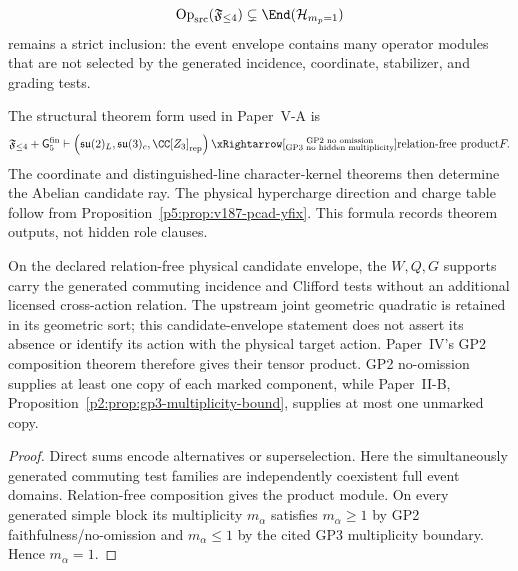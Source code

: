 \documentclass[12pt,a4paper]{article}
\begin{document}
\begin{equation}
\label{p5:eq:src-op-subset-envelope}
\operatorname{Op}_{\rm src}(\mathfrak F_{\le4})
\subsetneq
\End(\mathcal H_{m_p=1})
\end{equation}
remains a strict inclusion: the event envelope contains many operator modules
that are not selected by the generated incidence, coordinate, stabilizer, and
grading tests.

\begin{proposition}
\label{p5:prop:componentwise-closure-form}
The structural theorem form used in Paper~V-A is
\begin{equation}
\label{p5:eq:componentwise-theorem-form}
\mathfrak F_{\le4}+\mathsf G_5^{\rm fin}
\vdash
\left(
\mathfrak{su}(2)_L,
\mathfrak{su}(3)_c,
\CC[Z_3]_{\rm rep}
\right)
\xRightarrow[\substack{\text{GP2 no omission}\\
\text{GP3 no hidden multiplicity}}]{\text{relation-free product}}
F.
\end{equation}
The coordinate and distinguished-line character-kernel theorems then
determine the Abelian candidate ray.  The physical hypercharge direction and
charge table follow from Proposition~\ref{p5:prop:v187-pcad-yfix}.  This formula records
theorem outputs, not hidden role clauses.
\end{proposition}

\begin{theorem}
\label{p5:thm:componentwise-no-deletion}
On the declared relation-free physical candidate envelope, the \(W,Q,G\) supports carry the generated commuting incidence and Clifford tests without an additional licensed cross-action relation. The upstream joint geometric quadratic is retained in its geometric sort; this candidate-envelope statement does not assert its absence or identify its action with the physical target action.  Paper~IV's GP2 composition theorem
therefore gives their tensor product.  GP2 no-omission supplies at least one
copy of each marked component, while Paper~II-B,
Proposition~\ref{p2:prop:gp3-multiplicity-bound}, supplies at most one
unmarked copy.
\end{theorem}

\begin{proof}
Direct sums encode alternatives or superselection.  Here the simultaneously
generated commuting test families are independently coexistent full event
domains.  Relation-free composition gives the product module.  On every
generated simple block its multiplicity \(m_\alpha\) satisfies
\(m_\alpha\ge1\) by GP2 faithfulness/no-omission and \(m_\alpha\le1\) by the
cited GP3 multiplicity boundary.  Hence \(m_\alpha=1\).
\end{proof}
\end{document}

